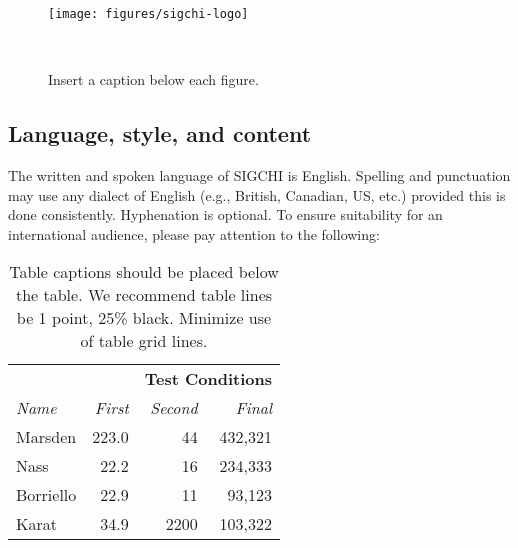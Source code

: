 \begin{figure}
  \texttt{[image: figures/sigchi-logo]}
  \caption{Insert a caption below each figure.}~\label{fig:sample}
\end{figure}

\subsection{Language, style, and content}
The written and spoken language of SIGCHI is English. Spelling and
punctuation may use any dialect of English (e.g., British, Canadian,
US, etc.) provided this is done consistently. Hyphenation is
optional. To ensure suitability for an international audience, please
pay attention to the following:

\begin{table}
  \centering
  \begin{tabular}{l r r r}
    & & \multicolumn{2}{c}{\small{\textbf{Test Conditions}}} \\
    \cmidrule(r){3-4}
    {\small\textit{Name}}
    & {\small \textit{First}}
      & {\small \textit{Second}}
    & {\small \textit{Final}} \\
    \midrule
    Marsden & 223.0 & 44 & 432,321 \\
    Nass & 22.2 & 16 & 234,333 \\
    Borriello & 22.9 & 11 & 93,123 \\
    Karat & 34.9 & 2200 & 103,322 \\
  \end{tabular}
  \caption{Table captions should be placed below the table. We
    recommend table lines be 1 point, 25\% black. Minimize use of
    table grid lines.}~\label{tab:table1}
\end{table}

